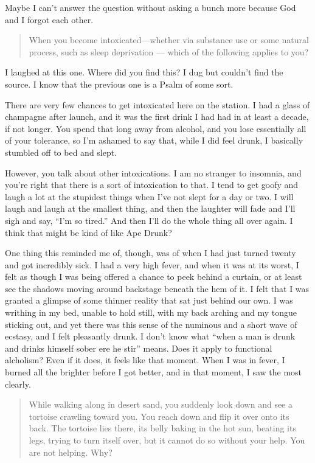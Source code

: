 Maybe I can't answer the question without asking a bunch more because God and I forgot each other.

\begin{quote}
When you become intoxicated---whether via substance use or some natural process, such as sleep deprivation — which of the following applies to you?
\end{quote}

\noindent I laughed at this one. Where did you find this? I dug but couldn't find the source. I know that the previous one is a Psalm of some sort.

There are very few chances to get intoxicated here on the station. I had a glass of champagne after launch, and it was the first drink I had had in at least a decade, if not longer. You spend that long away from alcohol, and you lose essentially all of your tolerance, so I'm ashamed to say that, while I did feel drunk, I basically stumbled off to bed and slept.

However, you talk about other intoxications. I am no stranger to insomnia, and you're right that there is a sort of intoxication to that. I tend to get goofy and laugh a lot at the stupidest things when I've not slept for a day or two. I will laugh and laugh at the smallest thing, and then the laughter will fade and I'll sigh and say, ``I'm so tired.'' And then I'll do the whole thing all over again. I think that might be kind of like Ape Drunk?

One thing this reminded me of, though, was of when I had just turned twenty and got incredibly sick. I had a very high fever, and when it was at its worst, I felt as though I was being offered a chance to peek behind a curtain, or at least see the shadows moving around backstage beneath the hem of it. I felt that I was granted a glimpse of some thinner reality that sat just behind our own. I was writhing in my bed, unable to hold still, with my back arching and my tongue sticking out, and yet there was this sense of the numinous and a short wave of ecstasy, and I felt pleasantly drunk. I don't know what ``when a man is drunk and drinks himself sober ere he stir'' means. Does it apply to functional alcholism? Even if it does, it feels like that moment. When I was in fever, I burned all the brighter before I got better, and in that moment, I saw the most clearly.

\begin{quote}
While walking along in desert sand, you suddenly look down and see a tortoise crawling toward you. You reach down and flip it over onto its back. The tortoise lies there, its belly baking in the hot sun, beating its legs, trying to turn itself over, but it cannot do so without your help. You are not helping. Why?
\end{quote}

